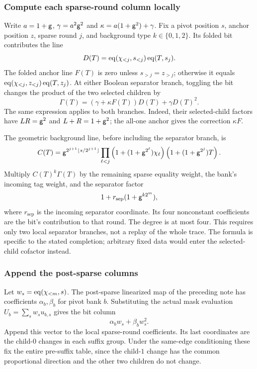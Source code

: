 \subsubsection{Compute each sparse-round column locally}

Write $a=1+\mathsf{g}$, $\gamma=a^2\mathsf{g}^2$ and $\kappa=a(1+\mathsf{g}^2)+\gamma$. Fix a pivot position $s$, anchor position $z$, sparse round $j$, and background type $k\in\{0,1,2\}$. Its folded bit contributes the line
\[
 D(T)=\operatorname{eq}(\chi_{<j},s_{<j})\operatorname{eq}(T,s_j).
\]
The folded anchor line $F(T)$ is zero unless $s_{>j}=z_{>j}$; otherwise it equals $\operatorname{eq}(\chi_{<j},z_{<j})\operatorname{eq}(T,z_j)$. At either Boolean separator branch, toggling the bit changes the product of the two selected children by
\[
 \Gamma(T)=(\gamma+\kappa F(T))D(T)+\gamma D(T)^2.
\]
The same expression applies to both branches. Indeed, their selected-child factors have $LR=\mathsf{g}^2$ and $L+R=1+\mathsf{g}^2$; the all-one anchor gives the correction $\kappa F$.

The geometric background line, before including the separator branch, is
\[
 C(T)=\mathsf{g}^{2^{j+1}\lfloor s/2^{j+1}\rfloor}
 \prod_{\ell<j}\left(1+(1+\mathsf{g}^{2^\ell})\chi_\ell\right)
 \left(1+(1+\mathsf{g}^{2^j})T\right).
\]
Multiply $C(T)^k\Gamma(T)$ by the remaining sparse equality weight, the bank's incoming tag weight, and the separator factor
\[
 1+r_{\mathrm{sep}}(1+\mathsf{g}^{k2^m}),
\]
where $r_{\mathrm{sep}}$ is the incoming separator coordinate. Its four nonconstant coefficients are the bit's contribution to that round. The degree is at most four. This requires only two local separator branches, not a replay of the whole trace. The formula is specific to the stated completion; arbitrary fixed data would enter the selected-child cofactor instead.

\subsubsection{Append the post-sparse columns}

Let $w_s=\operatorname{eq}(\chi_{<m},s)$. The post-sparse linearized map of the preceding note has coefficients $\alpha_b,\beta_b$ for pivot bank $b$. Substituting the actual mask evaluation $U_b=\sum_s w_su_{b,s}$ gives the bit column
\[
 \alpha_bw_s+\beta_bw_s^2.
\]
Append this vector to the local sparse-round coefficients. Its last coordinates are the child-$0$ changes in each suffix group. Under the same-edge conditioning these fix the entire pre-suffix table, since the child-$1$ change has the common proportional direction and the other two children do not change.

